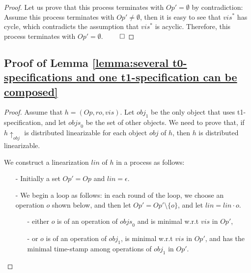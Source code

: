 {\begin {proof}
Let us prove that this process terminates with $\mathit{Op}' = \emptyset$ by contradiction: Assume this process terminates with $\mathit{Op}' \neq \emptyset$, then it is easy to see that $\mathit{vis}^*$ has cycle, which contradicts the assumption that $\mathit{vis}^*$ is acyclic. Therefore, this process terminates with $\mathit{Op}' = \emptyset$. $\qed$
\end {proof}





\subsection{Proof of Lemma \ref{lemma:several t0-specifications and one t1-specification can be composed}}
\label{subsec:appendix proofs of lemma several t0-specifications and one t1-specification can be composed}


\composingTZeroAndOneTOne*
\begin {proof}
Assume that $h = (\mathit{Op},\mathit{ro},\mathit{vis})$. Let $\mathit{obj}_1$ be the only object that uses t1-specification, and let $\mathit{objs}_0$ be the set of other objects. We need to prove that, if $h \uparrow_{\mathit{obj}}$ is distributed linearizable for each object $\mathit{obj}$ of $h$, then $h$ is distributed linearizable.

We construct a linearization $\mathit{lin}$ of $h$ in a process as follows:

\begin{itemize}
\setlength{\itemsep}{0.5pt}
\item[-] Initially a set $\mathit{Op}' = \mathit{Op}$ and $\mathit{lin} = \epsilon$.

\item[-] We begin a loop as follows: in each round of the loop, we choose an operation $o$ shown below, and then let $\mathit{Op}' = \mathit{Op}' \setminus \{ o \}$, and let $\mathit{lin} = \mathit{lin} \cdot o$.

    \begin{itemize}
    \setlength{\itemsep}{0.5pt}
    \item[-] either $o$ is of an operation of $\mathit{objs}_0$ and is minimal w.r.t $\mathit{vis}$ in $\mathit{Op}'$,

    \item[-] or $o$ is of an operation of $\mathit{obj}_1$, is minimal w.r.t $\mathit{vis}$ in $\mathit{Op}'$, and has the minimal time-stamp among operations of $\mathit{obj}_1$ in $\mathit{Op}'$.
    \end{itemize}
\end{itemize}


\end{proof}}
